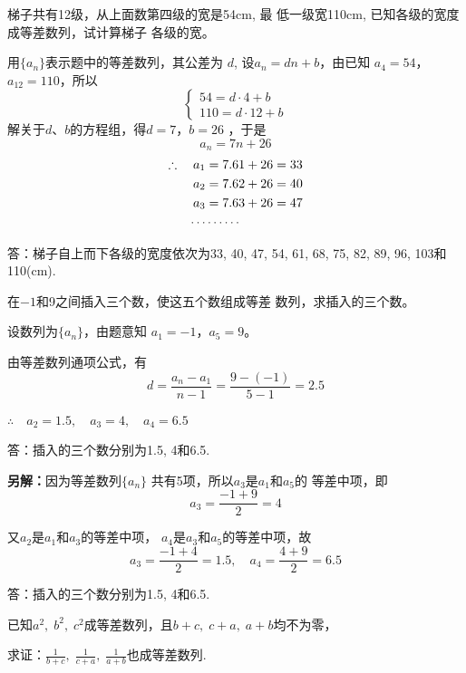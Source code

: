 \begin{example}
    梯子共有12级，从上面数第四级的宽是54cm, 最
低一级宽110cm, 已知各级的宽度成等差数列，试计算梯子
各级的宽。
\end{example}

\begin{solution}
    用$\{a_n\}$表示题中的等差数列，其公差为
$d$, 设$a_n=dn+b$，由已知
$a_4=54$，$a_{12}=110$，所以
\[\begin{cases}
    54=d\cdot 4+b\\
    110=d\cdot 12+b
\end{cases}\]
解关于$d$、$b$的方程组，得$d=7$，$b=26$
，于是
\[a_n=7n+26\]
\[\begin{split}
\therefore\quad a_1&=7.6 1+26=33\\
a_2&=7.62+26=40\\
a_3&=7.63+26=47\\
\cdots & \cdots\cdots
\end{split}\]

答：梯子自上而下各级的宽度依次为33, 40, 47, 54, 
61, 68, 75, 82, 89, 96, 103和110(cm).
\end{solution}

\begin{example}
    在$-1$和9之间插入三个数，使这五个数组成等差
数列，求插入的三个数。
\end{example}

\begin{solution}
    设数列为$\{a_n\}$，由题意知
$a_1=-1$，$a_5=9$。

由等差数列通项公式，有
\[d=\frac{a_n-a_1}{n-1}=\frac{9-(-1)}{5-1}=2.5\]

$\therefore\quad a_2=1.5,\quad a_3=4,\quad a_4=6.5$

答：插入的三个数分别为1.5, 4和6.5.

\textbf{另解：}因为等差数列$\{a_n\}$
共有5项，所以$a_3$是$a_1$和$a_5$的
等差中项，即
\[a_3=\frac{-1+9}{2}=4\]

又$a_2$是$a_1$和$a_3$的等差中项，
$a_4$是$a_3$和$a_5$的等差中项，故
\[a_3=\frac{-1+4}{2}=1.5,\quad a_4=\frac{4+9}{2}=6.5\]

答：插入的三个数分别为1.5, 4和6.5.
\end{solution}

\begin{example}
已知$a^2,\;b^2,\;c^2$成等差数列，且$b+c,\;c+a,\;a+b$均不为零，

求证：$\frac{1}{b+c},\;\frac{1}{c+a},\; \frac{1}{a+b}$也成等差数列.
\end{example}

